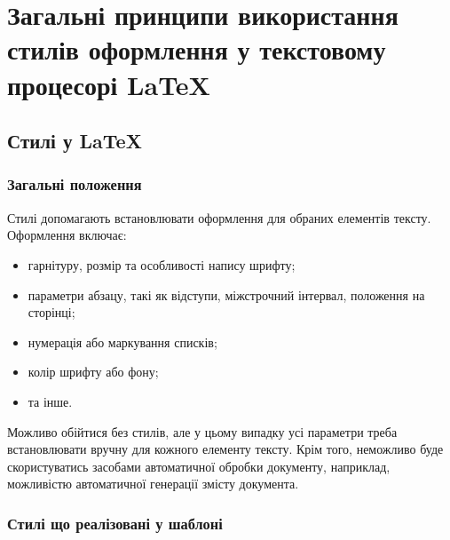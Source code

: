 \section{Загальні принципи використання стилів оформлення у текстовому процесорі \LaTeX{}}
\subsection{Стилі у \LaTeX{}}
\subsubsection{Загальні положення}

Стилі допомагають встановлювати оформлення для обраних елементів тексту. Оформлення включає:
\begin{itemize}
\item гарнітуру, розмір та особливості напису шрифту;
\item параметри абзацу, такі як відступи, міжстрочний інтервал, положення на сторінці;
\item нумерація або маркування списків;
\item колір шрифту або фону;
\item та інше.
\end{itemize}

Можливо обійтися без стилів, але у цьому випадку усі параметри треба встановлювати вручну для кожного елементу тексту. Крім того, неможливо буде скористуватись засобами автоматичної обробки документу, наприклад, можливістю автоматичної генерації змісту документа. 

\subsubsection{Стилі що реалізовані у шаблоні}

